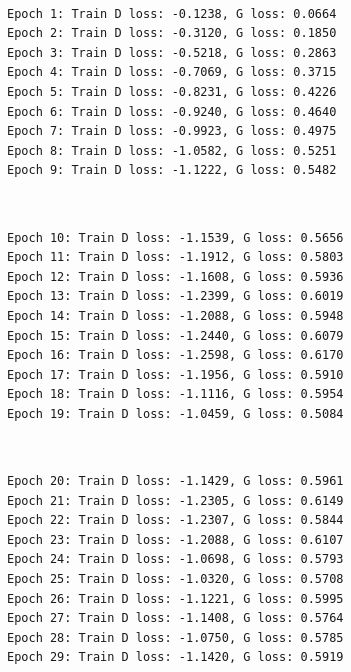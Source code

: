 \documentclass[11pt]{article}
\begin{document}
    \begin{center}
    \end{center}
    { \hspace*{\fill} \\}
    
    \begin{Verbatim}[commandchars=\\\{\}]
Epoch 1: Train D loss: -0.1238, G loss: 0.0664
Epoch 2: Train D loss: -0.3120, G loss: 0.1850
Epoch 3: Train D loss: -0.5218, G loss: 0.2863
Epoch 4: Train D loss: -0.7069, G loss: 0.3715
Epoch 5: Train D loss: -0.8231, G loss: 0.4226
Epoch 6: Train D loss: -0.9240, G loss: 0.4640
Epoch 7: Train D loss: -0.9923, G loss: 0.4975
Epoch 8: Train D loss: -1.0582, G loss: 0.5251
Epoch 9: Train D loss: -1.1222, G loss: 0.5482

    \end{Verbatim}

    \begin{center}
    \end{center}
    { \hspace*{\fill} \\}
    
    \begin{Verbatim}[commandchars=\\\{\}]
Epoch 10: Train D loss: -1.1539, G loss: 0.5656
Epoch 11: Train D loss: -1.1912, G loss: 0.5803
Epoch 12: Train D loss: -1.1608, G loss: 0.5936
Epoch 13: Train D loss: -1.2399, G loss: 0.6019
Epoch 14: Train D loss: -1.2088, G loss: 0.5948
Epoch 15: Train D loss: -1.2440, G loss: 0.6079
Epoch 16: Train D loss: -1.2598, G loss: 0.6170
Epoch 17: Train D loss: -1.1956, G loss: 0.5910
Epoch 18: Train D loss: -1.1116, G loss: 0.5954
Epoch 19: Train D loss: -1.0459, G loss: 0.5084

    \end{Verbatim}

    \begin{center}
    \end{center}
    { \hspace*{\fill} \\}
    
    \begin{Verbatim}[commandchars=\\\{\}]
Epoch 20: Train D loss: -1.1429, G loss: 0.5961
Epoch 21: Train D loss: -1.2305, G loss: 0.6149
Epoch 22: Train D loss: -1.2307, G loss: 0.5844
Epoch 23: Train D loss: -1.2088, G loss: 0.6107
Epoch 24: Train D loss: -1.0698, G loss: 0.5793
Epoch 25: Train D loss: -1.0320, G loss: 0.5708
Epoch 26: Train D loss: -1.1221, G loss: 0.5995
Epoch 27: Train D loss: -1.1408, G loss: 0.5764
Epoch 28: Train D loss: -1.0750, G loss: 0.5785
Epoch 29: Train D loss: -1.1420, G loss: 0.5919

    \end{Verbatim}
\end{document}
